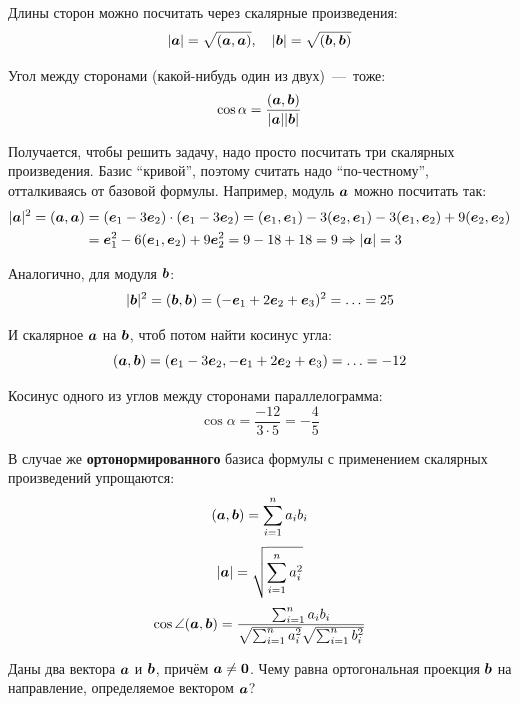 \documentclass[a4paper,12pt]{article}
\begin{document}
  \begin{solution}
    Длины сторон можно посчитать через скалярные произведения:
    \[
      |\boldsymbol a| = \sqrt{(\boldsymbol a, \boldsymbol a)},\quad |\boldsymbol b| = \sqrt{(\boldsymbol b, \boldsymbol b)}
    \]
    
    Угол между сторонами (какой-нибудь один из двух)~---~тоже:
    \[
      \cos \alpha = \frac{(\boldsymbol a, \boldsymbol b)}{|\boldsymbol a| |\boldsymbol b|}
    \]
    
    Получается, чтобы решить задачу, надо просто посчитать три скалярных произведения.
    Базис ``кривой'', поэтому считать надо ``по-честному'', отталкиваясь от базовой формулы.
    Например, модуль $\boldsymbol a$ можно посчитать так:
    \begin{equation*}
    \begin{split}
      |\boldsymbol a|^2 = (\boldsymbol a, \boldsymbol a) &= (\boldsymbol e_1 - 3 \boldsymbol e_2) \cdot (\boldsymbol e_1 - 3 \boldsymbol e_2)
      = (\boldsymbol e_1, \boldsymbol e_1) - 3 (\boldsymbol e_2, \boldsymbol e_1) - 3 (\boldsymbol e_1, \boldsymbol e_2) + 9 (\boldsymbol e_2, \boldsymbol e_2)\\
      &= \boldsymbol e_1^2 - 6 (\boldsymbol e_1, \boldsymbol e_2) + 9 \boldsymbol e_2^2
      = 9 - 18 + 18 = 9
      \Rightarrow |\boldsymbol a| = 3
    \end{split}
    \end{equation*}
    
    Аналогично, для модуля $\boldsymbol b$:
    \[
      |\boldsymbol b|^2 = (\boldsymbol b, \boldsymbol b) = (-\boldsymbol e_1 + 2 \boldsymbol e_2 + \boldsymbol e_3)^2 = \ldots = 25
    \]
    
    И скалярное $\boldsymbol a$ на $\boldsymbol b$, чтоб потом найти косинус угла:
    \[
      (\boldsymbol a, \boldsymbol b) = (\boldsymbol e_1 - 3 \boldsymbol e_2, -\boldsymbol e_1 + 2 \boldsymbol e_2 + \boldsymbol e_3) = \ldots = -12
    \]
    
    Косинус одного из углов между сторонами параллелограмма:
    \[
      \cos \alpha = \frac{-12}{3 \cdot 5} = -\frac{4}{5}
    \]
  \end{solution}
  
  
  В случае же \textbf{ортонормированного} базиса формулы с применением скалярных произведений упрощаются:
  \begin{equation}\label{eq:scalar-product-simplified}
    (\boldsymbol a, \boldsymbol b) = \sum_{i=1}^n a_i b_i
  \end{equation}
  \[
    |\boldsymbol a| = \sqrt{\sum_{i=1}^n a_i^2}
  \]
  \[
    \cos\angle(\boldsymbol a, \boldsymbol b) = \frac{\sum_{i=1}^n a_i b_i}{\sqrt{\sum_{i=1}^n a_i^2} \sqrt{\sum_{i=1}^n b_i^2}}
  \]
  
  
  \begin{problem}[2.24]
    Даны два вектора $\boldsymbol a$ и $\boldsymbol b$, причём $\bds a \hm{\not=} \bds 0$.
    Чему равна ортогональная проекция $\boldsymbol b$ на направление, определяемое вектором $\boldsymbol a$?
  \end{problem}
  
\end{document}
